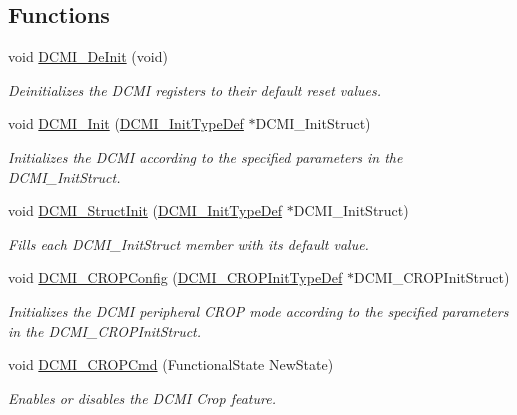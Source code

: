 \subsection*{Functions}
\begin{DoxyCompactItemize}
\item 
void \hyperlink{group___d_c_m_i_gab8f501f117d5695017e1dc5a611a5015}{D\-C\-M\-I\-\_\-\-De\-Init} (void)
\begin{DoxyCompactList}\small\item\em Deinitializes the D\-C\-M\-I registers to their default reset values. \end{DoxyCompactList}\item 
void \hyperlink{group___d_c_m_i_ga1299076f1459525053ba4f2fa408ed2a}{D\-C\-M\-I\-\_\-\-Init} (\hyperlink{struct_d_c_m_i___init_type_def}{D\-C\-M\-I\-\_\-\-Init\-Type\-Def} $\ast$D\-C\-M\-I\-\_\-\-Init\-Struct)
\begin{DoxyCompactList}\small\item\em Initializes the D\-C\-M\-I according to the specified parameters in the D\-C\-M\-I\-\_\-\-Init\-Struct. \end{DoxyCompactList}\item 
void \hyperlink{group___d_c_m_i_ga268eb4266fe7f294ee748e86f7b8add2}{D\-C\-M\-I\-\_\-\-Struct\-Init} (\hyperlink{struct_d_c_m_i___init_type_def}{D\-C\-M\-I\-\_\-\-Init\-Type\-Def} $\ast$D\-C\-M\-I\-\_\-\-Init\-Struct)
\begin{DoxyCompactList}\small\item\em Fills each D\-C\-M\-I\-\_\-\-Init\-Struct member with its default value. \end{DoxyCompactList}\item 
void \hyperlink{group___d_c_m_i_ga3bd4eb06314ed06dcb71ee91391b7ec4}{D\-C\-M\-I\-\_\-\-C\-R\-O\-P\-Config} (\hyperlink{struct_d_c_m_i___c_r_o_p_init_type_def}{D\-C\-M\-I\-\_\-\-C\-R\-O\-P\-Init\-Type\-Def} $\ast$D\-C\-M\-I\-\_\-\-C\-R\-O\-P\-Init\-Struct)
\begin{DoxyCompactList}\small\item\em Initializes the D\-C\-M\-I peripheral C\-R\-O\-P mode according to the specified parameters in the D\-C\-M\-I\-\_\-\-C\-R\-O\-P\-Init\-Struct. \end{DoxyCompactList}\item 
void \hyperlink{group___d_c_m_i_ga7139eecdc0f7975b42cd2f9c5644d0a5}{D\-C\-M\-I\-\_\-\-C\-R\-O\-P\-Cmd} (Functional\-State New\-State)
\begin{DoxyCompactList}\small\item\em Enables or disables the D\-C\-M\-I Crop feature. \end{DoxyCompactList}\item 

\end{DoxyCompactItemize}
